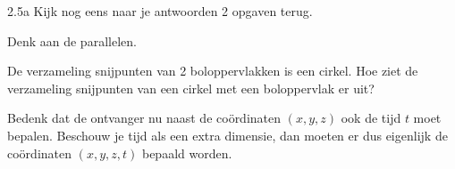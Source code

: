 \begin{Hint}{2.5a}
			Kijk nog eens naar je antwoorden 2 opgaven terug.
		
\end{Hint}
\begin{Hint}{2.14}
		Denk aan de parallelen.
	
\end{Hint}
\begin{Hint}{4.9}
		De verzameling snijpunten van 2 boloppervlakken is een cirkel. Hoe ziet de verzameling snijpunten van een cirkel met een boloppervlak er uit?
	
\end{Hint}
\begin{Hint}{4.15}
		Bedenk dat de ontvanger nu naast de co\"ordinaten $(x, y, z)$ ook de tijd $t$ moet bepalen. Beschouw je tijd als een extra dimensie, dan moeten er dus eigenlijk de co\"ordinaten $(x, y, z, t)$ bepaald worden.
	
\end{Hint}
